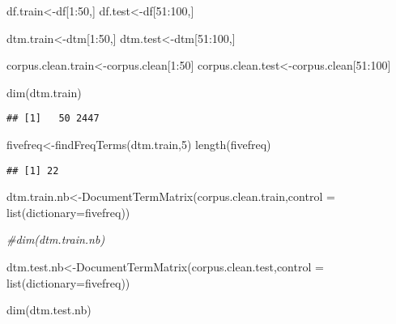 \documentclass[
]{article}
\newenvironment{Shaded}{\begin{snugshade}}{\end{snugshade}}
\newcommand{\AttributeTok}[1]{\textcolor[rgb]{0.77,0.63,0.00}{#1}}
\newcommand{\CommentTok}[1]{\textcolor[rgb]{0.56,0.35,0.01}{\textit{#1}}}
\newcommand{\DecValTok}[1]{\textcolor[rgb]{0.00,0.00,0.81}{#1}}
\newcommand{\FunctionTok}[1]{\textcolor[rgb]{0.00,0.00,0.00}{#1}}
\newcommand{\NormalTok}[1]{#1}
\newcommand{\OtherTok}[1]{\textcolor[rgb]{0.56,0.35,0.01}{#1}}
\newcommand{\SpecialCharTok}[1]{\textcolor[rgb]{0.00,0.00,0.00}{#1}}
\begin{document}
\begin{Shaded}
\begin{Highlighting}[]
\NormalTok{df.train}\OtherTok{\textless{}{-}}\NormalTok{df[}\DecValTok{1}\SpecialCharTok{:}\DecValTok{50}\NormalTok{,]}
\NormalTok{df.test}\OtherTok{\textless{}{-}}\NormalTok{df[}\DecValTok{51}\SpecialCharTok{:}\DecValTok{100}\NormalTok{,]                                            }

\NormalTok{dtm.train}\OtherTok{\textless{}{-}}\NormalTok{dtm[}\DecValTok{1}\SpecialCharTok{:}\DecValTok{50}\NormalTok{,]}
\NormalTok{dtm.test}\OtherTok{\textless{}{-}}\NormalTok{dtm[}\DecValTok{51}\SpecialCharTok{:}\DecValTok{100}\NormalTok{,]}

\NormalTok{corpus.clean.train}\OtherTok{\textless{}{-}}\NormalTok{corpus.clean[}\DecValTok{1}\SpecialCharTok{:}\DecValTok{50}\NormalTok{]}
\NormalTok{corpus.clean.test}\OtherTok{\textless{}{-}}\NormalTok{corpus.clean[}\DecValTok{51}\SpecialCharTok{:}\DecValTok{100}\NormalTok{]}

\FunctionTok{dim}\NormalTok{(dtm.train)}
\end{Highlighting}
\end{Shaded}

\begin{verbatim}
## [1]   50 2447
\end{verbatim}

\begin{Shaded}
\begin{Highlighting}[]
\NormalTok{fivefreq}\OtherTok{\textless{}{-}}\FunctionTok{findFreqTerms}\NormalTok{(dtm.train,}\DecValTok{5}\NormalTok{)}
\FunctionTok{length}\NormalTok{(fivefreq)}
\end{Highlighting}
\end{Shaded}

\begin{verbatim}
## [1] 22
\end{verbatim}

\begin{Shaded}
\begin{Highlighting}[]
\NormalTok{dtm.train.nb}\OtherTok{\textless{}{-}}\FunctionTok{DocumentTermMatrix}\NormalTok{(corpus.clean.train,}\AttributeTok{control =} \FunctionTok{list}\NormalTok{(}\AttributeTok{dictionary=}\NormalTok{fivefreq))}

\CommentTok{\#dim(dtm.train.nb)}

\NormalTok{dtm.test.nb}\OtherTok{\textless{}{-}}\FunctionTok{DocumentTermMatrix}\NormalTok{(corpus.clean.test,}\AttributeTok{control =} \FunctionTok{list}\NormalTok{(}\AttributeTok{dictionary=}\NormalTok{fivefreq))}

\FunctionTok{dim}\NormalTok{(dtm.test.nb)}
\end{Highlighting}
\end{Shaded}
\end{document}
